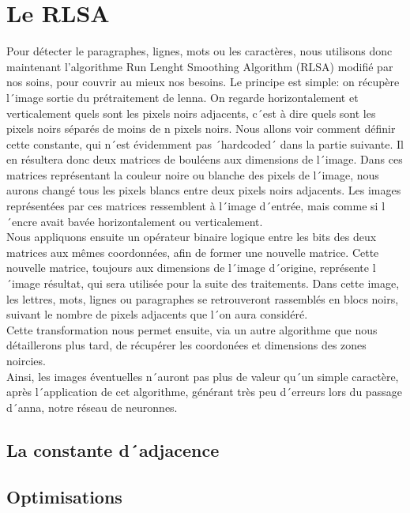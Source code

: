 \section{Le RLSA}

Pour détecter le paragraphes, lignes, mots ou les caractères, nous utilisons donc maintenant l'algorithme Run Lenght Smoothing Algorithm (RLSA) modifié par nos soins, pour couvrir au mieux nos besoins. Le principe est simple: on récupère l´image sortie du prétraitement de lenna. On regarde horizontalement et verticalement quels sont les pixels noirs adjacents, c´est à dire quels sont les pixels noirs séparés de moins de n pixels noirs. Nous allons voir comment définir cette constante, qui n´est évidemment pas ´hardcoded´ dans la partie suivante. Il en résultera donc deux matrices de bouléens aux dimensions de l´image. Dans ces matrices représentant la couleur noire ou blanche des pixels de l´image, nous aurons changé tous les pixels blancs entre deux pixels noirs adjacents. Les images représentées par ces matrices ressemblent à l´image d´entrée, mais comme si l´encre avait bavée horizontalement ou verticalement.\\
Nous appliquons ensuite un opérateur binaire logique entre les bits des deux matrices aux mêmes coordonnées, afin de former une nouvelle matrice. Cette nouvelle matrice, toujours aux dimensions de l´image d´origine, représente l´image résultat, qui sera utilisée pour la suite des traitements. Dans cette image, les lettres, mots, lignes ou paragraphes se retrouveront rassemblés en blocs noirs, suivant le nombre de pixels adjacents que l´on aura considéré.\\
Cette transformation nous permet ensuite, via un autre algorithme que nous détaillerons plus tard, de récupérer les coordonées et dimensions des zones noircies.\\
Ainsi, les images éventuelles n´auront pas plus de valeur qu´un simple caractère, après l´application de cet algorithme, générant très peu d´erreurs lors du passage d´anna, notre réseau de neuronnes.


\subsection{La constante d´adjacence}


\subsection{Optimisations}

